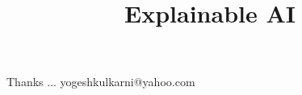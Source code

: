 \documentclass[xcolor=dvipsnames,compress,t,pdf,notes,9pt]{beamer}
\title[\insertframenumber /\inserttotalframenumber]{Explainable AI}
\begin{document}
	\begin{frame}
	\titlepage
	\end{frame}

	

	\begin{frame}[c]{}
	Thanks ...
	\vspace{5mm}
	yogeshkulkarni@yahoo.com
	\end{frame}
\end{document}
